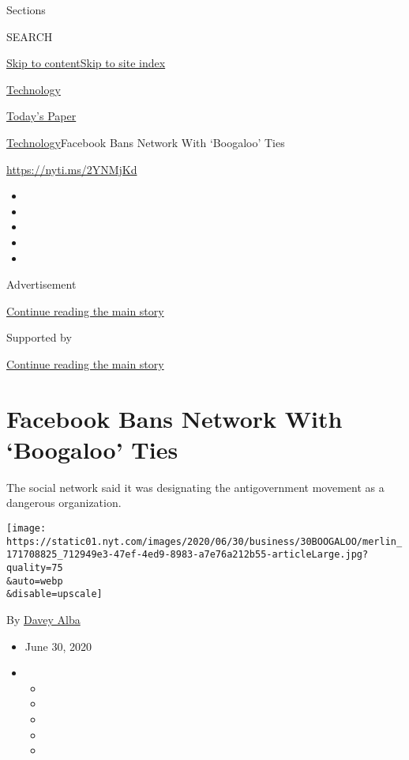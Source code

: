 Sections

SEARCH

\protect\hyperlink{site-content}{Skip to
content}\protect\hyperlink{site-index}{Skip to site index}

\href{https://www.nytimes.com/section/technology}{Technology}

\href{https://myaccount.nytimes.com/auth/login?response_type=cookie\&client_id=vi}{}

\href{https://www.nytimes.com/section/todayspaper}{Today's Paper}

\href{/section/technology}{Technology}\textbar{}Facebook Bans Network
With `Boogaloo' Ties

\url{https://nyti.ms/2YNMjKd}

\begin{itemize}
\item
\item
\item
\item
\item
\end{itemize}

Advertisement

\protect\hyperlink{after-top}{Continue reading the main story}

Supported by

\protect\hyperlink{after-sponsor}{Continue reading the main story}

\hypertarget{facebook-bans-network-with-boogaloo-ties}{%
\section{Facebook Bans Network With `Boogaloo'
Ties}\label{facebook-bans-network-with-boogaloo-ties}}

The social network said it was designating the antigovernment movement
as a dangerous organization.

\texttt{[image: https://static01.nyt.com/images/2020/06/30/business/30BOOGALOO/merlin\_171708825\_712949e3-47ef-4ed9-8983-a7e76a212b55-articleLarge.jpg?quality=75\\\&auto=webp\\\&disable=upscale]}

By \href{https://www.nytimes.com/by/davey-alba}{Davey Alba}

\begin{itemize}
\item
  June 30, 2020
\item
  \begin{itemize}
  \item
  \item
  \item
  \item
  \item
  \end{itemize}
\end{itemize}

